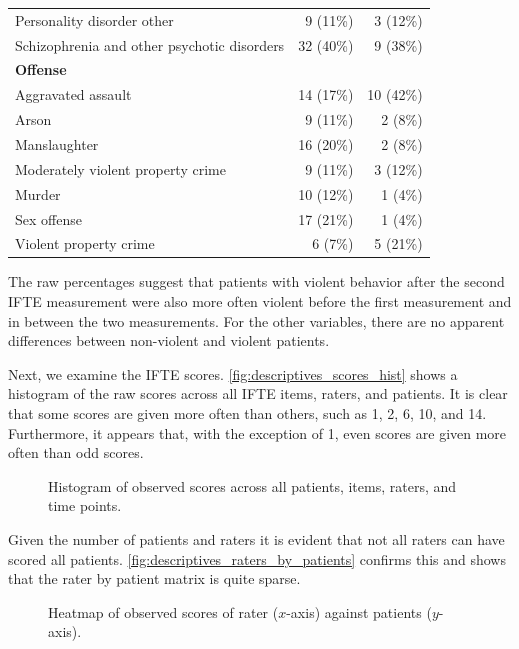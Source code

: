 \documentclass[a4paper,11pt]{article}
\begin{document}
\begin{table}[!ht]
\begin{tabular}{lrr}
\hspace{3mm} Personality disorder other 	 & 9 (11\%) & 3 (12\%) \\
\hspace{3mm} Schizophrenia and other psychotic disorders 	 & 32 (40\%) & 9 (38\%) \\
\textbf{Offense}		  &&\\
\hspace{3mm} Aggravated assault 	 & 14 (17\%) & 10 (42\%) \\
\hspace{3mm} Arson 	 & 9 (11\%) & 2 (8\%) \\
\hspace{3mm} Manslaughter 	 & 16 (20\%) & 2 (8\%) \\
\hspace{3mm} Moderately violent property crime 	 & 9 (11\%) & 3 (12\%) \\
\hspace{3mm} Murder 	 & 10 (12\%) & 1 (4\%) \\
\hspace{3mm} Sex offense 	 & 17 (21\%) & 1 (4\%) \\
\hspace{3mm} Violent property crime 	 & 6 (7\%) & 5 (21\%) \\
        \bottomrule
    \end{tabular}
\end{table}
The raw percentages suggest that patients with violent behavior after the second IFTE measurement were also more often violent before the first measurement and in between the two measurements.
For the other variables, there are no apparent differences between non-violent and violent patients.

Next, we examine the IFTE scores. 
\autoref{fig:descriptives_scores_hist} shows a histogram of the raw scores across all IFTE items, raters, and patients.
It is clear that some scores are given more often than others, such as 1, 2, 6, 10, and 14.
Furthermore, it appears that, with the exception of 1, even scores are given more often than odd scores.
\begin{figure}[!ht]
	\centering
	
	\caption{Histogram of observed scores across all patients, items, raters, and time points.}
	\label{fig:descriptives_scores_hist}
\end{figure}
Given the number of patients and raters it is evident that not all raters can have scored all patients.
\autoref{fig:descriptives_raters_by_patients} confirms this and shows that the rater by patient matrix is quite sparse.
\begin{figure}[!ht]
	\centering
	
	\caption{Heatmap of observed scores of rater ($x$-axis) against patients ($y$-axis).}
	\label{fig:descriptives_raters_by_patients}
\end{figure}
\end{document}
